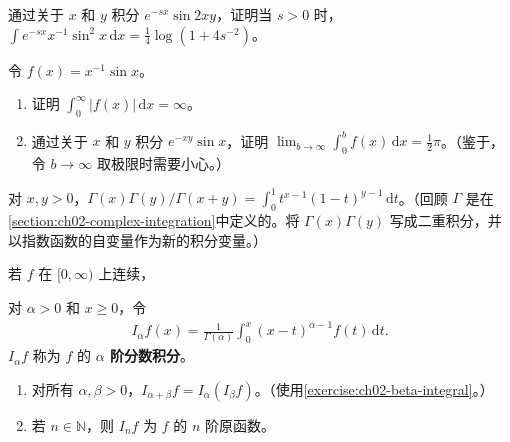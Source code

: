 \documentclass[../../main.tex]{subfiles}%
\begin{document}
\begin{exercise}\label{exercise:ch02-laplace-sine-square}
通过关于 $x$ 和 $y$ 积分 $e^{-sx}\sin2xy$，证明当 $s>0$ 时，$\int e^{-sx}x^{-1}\sin^2x\,\mathrm{d}x=\frac14\log(1+4s^{-2})$。
\end{exercise}
\begin{exercise}\label{exercise:ch02-dirichlet-integral}
令 $f(x)=x^{-1}\sin x$。
\begin{enumerate}
\item\label{item:ch02-dirichlet-not-absolute} 证明 $\int_0^\infty|f(x)|\,\mathrm{d}x=\infty$。
\item\label{item:ch02-dirichlet-value} 通过关于 $x$ 和 $y$ 积分 $e^{-xy}\sin x$，证明 $\lim_{b\to\infty}\int_0^b f(x)\,\mathrm{d}x=\frac12\pi$。（鉴于，令 $b\to\infty$ 取极限时需要小心。）
\end{enumerate}
\end{exercise}
\begin{exercise}\label{exercise:ch02-beta-integral}
对 $x,y>0$，$\Gamma(x)\Gamma(y)/\Gamma(x+y)=\int_0^1t^{x-1}(1-t)^{y-1}\,\mathrm{d}t$。（回顾 $\Gamma$ 是在\cref{section:ch02-complex-integration}中定义的。将 $\Gamma(x)\Gamma(y)$ 写成二重积分，并以指数函数的自变量作为新的积分变量。）
\end{exercise}
\begin{exercise}\label{exercise:ch02-fractional-integral}
若 $f$ 在 $[0,\infty)$ 上连续，
\begin{definition*}[分数阶积分]
对 $\alpha>0$ 和 $x\ge0$，令
\begin{align*}
I_\alpha f(x)=\frac1{\Gamma(\alpha)}\int_0^x(x-t)^{\alpha-1}f(t)\,\mathrm{d}t.
\end{align*}
$I_\alpha f$ 称为 $f$ 的 \textbf{$\alpha$ 阶分数积分}。
\end{definition*}
\begin{enumerate}
\item\label{item:ch02-fractional-integral-semigroup} 对所有 $\alpha,\beta>0$，$I_{\alpha+\beta}f=I_\alpha(I_\beta f)$。（使用\cref{exercise:ch02-beta-integral}。）
\item\label{item:ch02-integer-integral-antiderivative} 若 $n\in\mathbb{N}$，则 $I_nf$ 为 $f$ 的 $n$ 阶原函数。
\end{enumerate}
\end{exercise}
\end{document}
